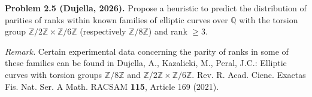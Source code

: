 \textbf{Problem 2.5 (Dujella, 2026).} Propose a heuristic to predict the distribution of parities of ranks within known families of elliptic curves over $\mathbb{Q}$ with the torsion group $\mathbb{Z}/2\mathbb{Z}\times\mathbb{Z}/6\mathbb{Z}$ (respectively $\mathbb{Z}/8\mathbb{Z}$) and rank $\geqslant 3$.

\medskip

\textit{Remark.} Certain experimental data concerning the parity of ranks in some of these families can be found in Dujella, A., Kazalicki, M., Peral, J.C.: Elliptic curves with torsion groups $\mathbb{Z}/8\mathbb{Z}$ and $\mathbb{Z}/2\mathbb{Z}\times\mathbb{Z}/6\mathbb{Z}$. Rev. R. Acad. Cienc. Exactas Fis. Nat. Ser. A Math. RACSAM \textbf{115}, Article 169 (2021).
